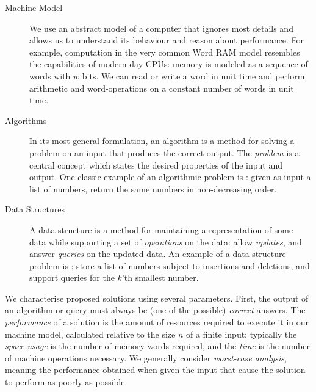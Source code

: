 \begin{description}
    \item[Machine Model] We use an abstract model of a computer that ignores most details and allows us to understand its behaviour and reason about performance.
    For example, computation in the very common Word RAM model resembles the capabilities of modern day CPUs: memory is modeled as a sequence of words with $w$ bits. We can read or write a word in unit time and perform arithmetic and word-operations on a constant number of words in unit time.
    \item[Algorithms] In its most general formulation, an algorithm is a method for solving a problem on an input that produces the correct output. 
    The \emph{problem} is a central concept which states the desired properties of the input and output.
    One classic example of an algorithmic problem is : given as input a list of numbers, return the same numbers in non-decreasing order.
    \item[Data Structures] A data structure is a method for maintaining a representation of some data while supporting a set of \emph{operations} on the data: allow \emph{updates}, and answer \emph{queries} on the updated data. 
    An example of a data structure problem is : store a list of numbers subject to insertions and deletions, and support queries for the $k$'th smallest number.
\end{description}

We characterise proposed solutions using several parameters.
First, the output of an algorithm or query must always be (one of the possible) \emph{correct} answers.
The \emph{performance} of a solution is the amount of resources required to execute it in our machine model, calculated relative to the size $n$ of a finite input: typically the \emph{space usage} is the number of memory words required, and the \emph{time} is the number of machine operations necessary. We generally consider \emph{worst-case analysis}, meaning the performance obtained when given the input that cause the solution to perform as poorly as possible.

